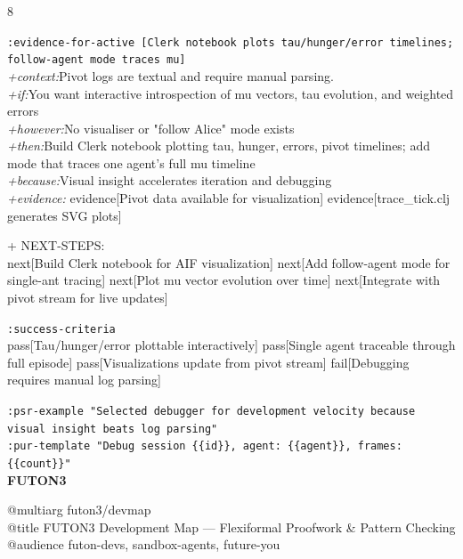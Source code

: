\documentclass[landscape]{article}
\newcommand{\flexitag}[1]{\textcolor[gray]{0.35}{\textit{#1}}}
\newenvironment{devmapgreenfield}{%
  \def\FrameCommand{\colorbox{devmapgreenfieldbg}}%
  \setlength{\fboxsep}{2pt}%
  \MakeFramed{\advance\hsize-\width \FrameRestore}%
}{\endMakeFramed}
\begin{document}
\begin{paracol}{8}
\begin{devmapgreenfield}
  \texttt{:\allowbreak{}evidence-\allowbreak{}for-\allowbreak{}active [Clerk notebook plots tau/\allowbreak{}hunger/\allowbreak{}error timelines;\allowbreak{} follow-\allowbreak{}agent mode traces mu]}\\
  \flexitag{+context:}Pivot logs are textual and require manual parsing.\\
  \flexitag{+if:}You want interactive introspection of mu vectors, tau evolution, and weighted errors\\
  \flexitag{+however:}No visualiser or "follow Alice" mode exists\\
  \flexitag{+then:}Build Clerk notebook plotting tau, hunger, errors, pivot timelines; add mode that traces one agent’s full mu timeline\\
  \flexitag{+because:}Visual insight accelerates iteration and debugging\\
  \flexitag{+evidence:} evidence[Pivot data available for visualization] evidence[trace\_tick.clj generates SVG plots]\\
\par
  + NEXT-STEPS:\\
    next[Build Clerk notebook for AIF visualization] next[Add follow-agent mode for single-ant tracing] next[Plot mu vector evolution over time] next[Integrate with pivot stream for live updates]\\
\par
  \texttt{:\allowbreak{}success-\allowbreak{}criteria}\\
    pass[Tau/hunger/error plottable interactively] pass[Single agent traceable through full episode] pass[Visualizations update from pivot stream] fail[Debugging requires manual log parsing]\\
\par
  \texttt{:\allowbreak{}psr-\allowbreak{}example "Selected debugger for development velocity because visual insight beats log parsing"}\\
  \texttt{:\allowbreak{}pur-\allowbreak{}template "Debug session \{\{id\}\},\allowbreak{} agent:\allowbreak{} \{\{agent\}\},\allowbreak{} frames:\allowbreak{} \{\{count\}\}"}\\
\end{devmapgreenfield}
\switchcolumn
\textbf{FUTON3}\par
\medskip
@multiarg futon3/devmap\\
@title FUTON3 Development Map — Flexiformal Proofwork \& Pattern Checking\\
@audience futon-devs, sandbox-agents, future-you\\

\end{paracol}
\end{document}
